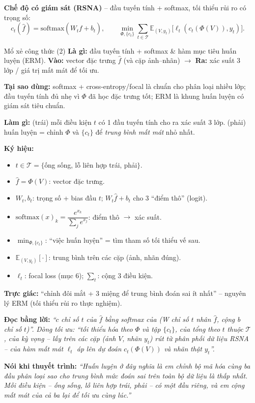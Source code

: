 \documentclass[12pt,a4paper]{article}
\begin{document}
\textbf{Chế độ có giám sát (RSNA)} -- đầu tuyến tính + softmax, tối thiểu rủi ro có trọng số:
\begin{equation}
c_t(\hat f)=\mathrm{softmax}(W_t\hat f+b_t),\qquad
\min_{\Phi,\{c_t\}}\sum_{t\in\mathcal{T}}\mathbb{E}_{(V,y_t)}\big[\ell_t(c_t(\Phi(V)),y_t)\big].
\label{eq:erm}
\end{equation}
\begin{ctbox}{Mổ xẻ công thức (2)}
\textbf{Là gì:} đầu tuyến tính + softmax \& hàm mục tiêu huấn luyện (ERM). \quad\textbf{Vào:} vector đặc trưng $\hat f$ (và cặp ảnh--nhãn) $\to$ \textbf{Ra:} xác suất 3 lớp / giá trị mất mát để tối ưu.

\textbf{Tại sao dùng:} softmax + cross-entropy/focal là chuẩn cho phân loại nhiều lớp; đầu tuyến tính đủ nhẹ vì $\Phi$ đã học đặc trưng tốt; ERM là khung huấn luyện có giám sát tiêu chuẩn.

\textbf{Làm gì:} (trái) mỗi điều kiện $t$ có 1 đầu tuyến tính cho ra xác suất 3 lớp. (phải) huấn luyện = chỉnh $\Phi$ và $\{c_t\}$ để \emph{trung bình mất mát} nhỏ nhất.

\textbf{Ký hiệu:}
\begin{itemize}[leftmargin=1.4em,itemsep=1pt]
\item $t\in\mathcal{T}=\{$ống sống, lỗ liên hợp trái, phải$\}$.
\item $\hat f=\Phi(V)$: vector đặc trưng.
\item $W_t,b_t$: trọng số + bias đầu $t$; $W_t\hat f+b_t$ cho 3 ``điểm thô'' (logit).
\item $\mathrm{softmax}(x)_k=\dfrac{e^{x_k}}{\sum_j e^{x_j}}$: điểm thô $\to$ xác suất.
\item $\min_{\Phi,\{c_t\}}$: ``việc huấn luyện'' = tìm tham số tối thiểu vế sau.
\item $\mathbb{E}_{(V,y_t)}[\cdot]$: trung bình trên các cặp (ảnh, nhãn đúng).
\item $\ell_t$: focal loss (mục 6); $\sum_t$: cộng 3 điều kiện.
\end{itemize}
\textbf{Trực giác:} ``chỉnh đôi mắt + 3 miệng để trung bình đoán sai ít nhất'' -- nguyên lý ERM (tối thiểu rủi ro thực nghiệm).

\textbf{Đọc bằng lời:} \emph{``$c$ chỉ số $t$ của $\hat f$ bằng softmax của (W chỉ số $t$ nhân $\hat f$, cộng b chỉ số $t$)''. Dòng tối ưu: ``tối thiểu hóa theo $\Phi$ và tập $\{c_t\}$, của tổng theo $t$ thuộc $\mathcal{T}$, của kỳ vọng -- lấy trên các cặp (ảnh $V$, nhãn $y_t$) rút từ phân phối dữ liệu RSNA -- của hàm mất mát $\ell_t$ áp lên dự đoán $c_t(\Phi(V))$ và nhãn thật $y_t$''.}

\textbf{Nói khi thuyết trình:} \emph{``Huấn luyện ở đây nghĩa là em chỉnh bộ mã hóa cùng ba đầu phân loại sao cho trung bình mức đoán sai trên toàn bộ dữ liệu là thấp nhất. Mỗi điều kiện -- ống sống, lỗ liên hợp trái, phải -- có một đầu riêng, và em cộng mất mát của cả ba lại để tối ưu cùng lúc.''}
\end{ctbox}
\end{document}
